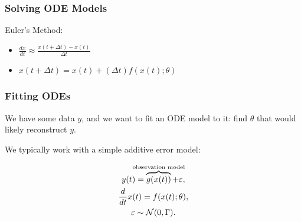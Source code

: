 \documentclass[aspectratio=169]{beamer}
\begin{document}
\begin{frame}[t]
  \frametitle{Solving ODE Models}

  Euler's Method:
  \begin{itemize}
    \item $\frac{dx}{dt} \approx \frac{x(t+\Delta t) - x(t)}{\Delta t}$
    
    \item $x(t + \Delta t) = x(t) + (\Delta t) f(x(t); \theta)$
  \end{itemize}
\end{frame}


\begin{frame}[t]
  \frametitle{Fitting ODEs}

  We have some data $y$, and we want to fit an ODE model to it: find $\theta$ that would likely reconstruct $y$.

  We typically work with a simple additive error model:

  \begin{equation*}
    \begin{gathered}
      y(t) = \overbrace{g(x(t))}^{\mathclap{\text{observation model}}} + \varepsilon,\\
      \frac{d}{dt} x(t) = f(x(t); \theta),\\
      \varepsilon \sim \mathcal{N}(0, \Gamma).
    \end{gathered}
  \end{equation*}
\end{frame}
\end{document}
